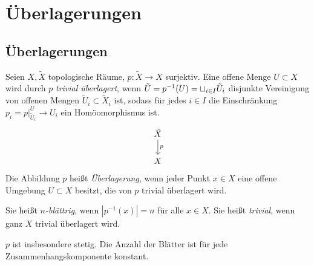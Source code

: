\chapter{Überlagerungen}



\section{Überlagerungen}


\begin{df}
	Seien $X, \tilde X$ topologische Räume, $p: \tilde X \to X$ surjektiv.
	Eine offene Menge $U \subset X$ wird durch $p$ \emph{trivial überlagert}, wenn $\tilde U = p^{-1} (U) = \sqcup_{i\in I} \tilde U_i$ disjunkte Vereinigung von offenen Mengen $\tilde U_i \subset \tilde X_i$ ist, sodass für jedes $i \in I$ die Einschränkung $p_i = p|_{\tilde U_i}^U \to U_i$ ein Homöomorphismus ist.
	\[
		\begin{tikzcd}
			\tilde X \arrow{d}{p} \\
			X
		\end{tikzcd}
	\]
	Die Abbildung $p$ heißt \emph{Überlagerung}, wenn jeder Punkt $x \in X$ eine offene Umgebung $U \subset X$ besitzt, die von $p$ trivial überlagert wird.

	Sie heißt \emph{$n$-blättrig}, wenn $|p^{-1}(x)| = n$ für alle $x \in X$.
	Sie heißt \emph{trivial}, wenn ganz $X$ trivial überlagert wird.
	\begin{note}
		$p$ ist insbesondere stetig.
		Die Anzahl der Blätter ist für jede Zusammenhangskomponente konstant.
	\end{note}
\end{df}

